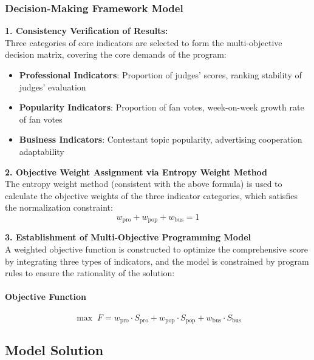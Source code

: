 \documentclass{mcmthesis}
\begin{document}
\subsubsection{Decision-Making Framework Model }
\noindent\textbf{1. Consistency Verification of Results:}\hfill\\
Three categories of core indicators are selected to form the multi-objective decision matrix, covering the core demands of the program:
\begin{itemize}
\item\textbf{Professional Indicators}: Proportion of judges' scores, ranking stability of judges' evaluation
\item\textbf{Popularity Indicators}: Proportion of fan votes, week-on-week growth rate of fan votes
\item\textbf{Business Indicators}: Contestant topic popularity, advertising cooperation adaptability
\end{itemize}
\noindent\textbf{2. Objective Weight Assignment via Entropy Weight Method}\hfill\\

The entropy weight method (consistent with the above formula) is used to calculate the objective weights of the three indicator categories, which satisfies the normalization constraint:
\begin{equation}
w_{\text{pro}} + w_{\text{pop}} + w_{\text{bus}} = 1
\end{equation}

\noindent\textbf{3. Establishment of Multi-Objective Programming Model}\hfill\\

A weighted objective function is constructed to optimize the comprehensive score by integrating three types of indicators, and the model is constrained by program rules to ensure the rationality of the solution:
\paragraph{Objective Function}
\begin{equation}
\max\; F = w_{\text{pro}} \cdot S_{\text{pro}} + w_{\text{pop}} \cdot S_{\text{pop}} + w_{\text{bus}} \cdot S_{\text{bus}}
\end{equation}

\subsection{Model Solution}
\end{document}
